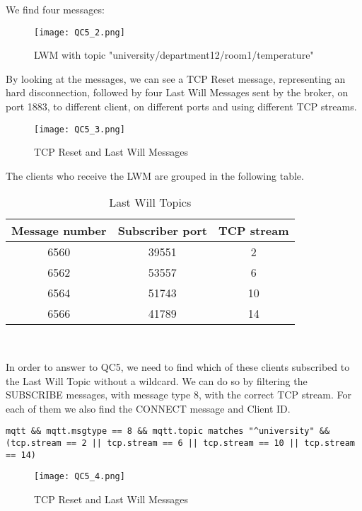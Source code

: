 We find four messages:
\begin{figure}[H]
    \centering
    \texttt{[image: QC5\_2.png]}
    \caption{LWM with topic "university/department12/room1/temperature"}
\end{figure}

By looking at the messages, we can see a TCP Reset message, representing an hard disconnection, followed by four Last Will Messages sent by the broker, on port 1883, to different client, on different ports and using different TCP streams.
\begin{figure}[H]
    \centering
    \texttt{[image: QC5\_3.png]}
    \caption{TCP Reset and Last Will Messages}
\end{figure}

The clients who receive the LWM are grouped in the following table.
\begin{table}[H]
\centering 
\begin{tabular}{| c | c | c |}
	\hline 
	\rowcolor{bluepoli!40}
	\textbf{Message number} & \textbf{Subscriber port} & \textbf{TCP stream}\T\B \\
	\hline 
	6560 & 39551 & 2 \T\B\\
	6562 & 53557 & 6 \T\B\\
	6564 & 51743 & 10 \T\B\\
	6566 & 41789 & 14 \T\B\\
	\hline
\end{tabular}
\\[10pt]
\caption{Last Will Topics}
\end{table}

In order to answer to QC5, we need to find which of these clients subscribed to the Last Will Topic without a wildcard. We can do so by filtering the SUBSCRIBE messages, with message type 8, with the correct TCP stream. For each of them we also find the CONNECT message and Client ID.
\begin{verbatim}
mqtt && mqtt.msgtype == 8 && mqtt.topic matches "^university" && 
(tcp.stream == 2 || tcp.stream == 6 || tcp.stream == 10 || tcp.stream == 14)
\end{verbatim}

\begin{figure}[H]
    \centering
    \texttt{[image: QC5\_4.png]}
    \caption{TCP Reset and Last Will Messages}
\end{figure}

